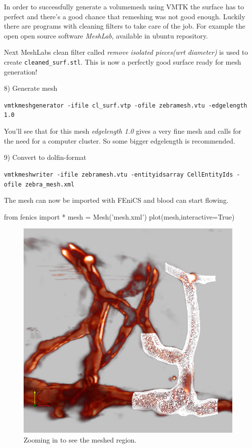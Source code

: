 \documentclass[epsfig,11pt]{article}
\begin{document}
In order to successfully generate a volumemesh using VMTK the surface has to perfect and there's a good chance that remeshing was not good enough. Luckily there are programs with cleaning filters to take care of the job. For example the open open source software \emph{MeshLab}, available in ubuntu repository. 

Next MeshLabs clean filter called \emph{remove isolated pieces(wrt diameter) } is used to create \texttt{cleaned\_surf.stl}. This is now a perfectly good surface ready for mesh generation!

8) Generate mesh
\begin{framed}       
    \texttt{vmtkmeshgenerator -ifile cl\_surf.vtp -ofile zebramesh.vtu -edgelength 1.0}
\end{framed}

You'll see that for this mesh \emph{edgelength 1.0} gives a very fine mesh and calls for the need for a computer cluster. So some bigger edgelength is recommended.

9) Convert to dolfin-format
\begin{framed}       
    \texttt{vmtkmeshwriter -ifile zebramesh.vtu -entityidsarray CellEntityIds -ofile zebra\_mesh.xml}
\end{framed}

The mesh can now be imported with FEniCS and blood can start flowing. 

\begin{python}
from fenics import *
mesh = Mesh('mesh.xml')
plot(mesh,interactive=True)
\end{python}


\begin{figure}[h!] 
\begin{center}
  \includegraphics[scale=0.3]{zoomed2.png}
  \end{center}
  \caption{Zooming in to see the meshed region.}
\end{figure}
\end{document}
